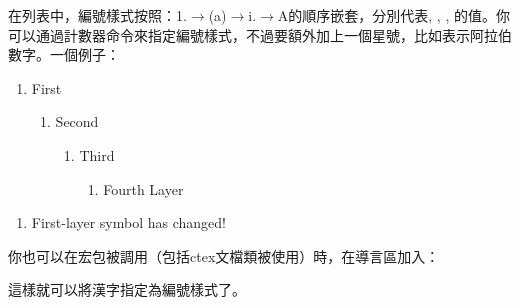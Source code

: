 在列表中，編號樣式按照：1.$\rightarrow$(a)$\rightarrow$i.$\rightarrow$A的順序嵌套，分別代表, , , 的值。你可以通過計數器命令來指定編號樣式，不過要額外加上一個星號，比如表示阿拉伯數字。一個例子：
\begin{codeshow}
\begin{enumerate}\item First
  \begin{enumerate}\item Second
     \begin{enumerate}\item Third
       \begin{enumerate}
       \item Fourth Layer
\end{enumerate}\end{enumerate}
\end{enumerate}\end{enumerate}
\renewcommand{\theenumi}
  {\roman{enumi}}
\renewcommand{\labelenumi}
  {(\theenumi)}
\begin{enumerate}
\item First-layer symbol has changed!
\end{enumerate}
\end{codeshow}

你也可以在宏包被調用（包括ctex文檔類被使用）時，在導言區加入：
\begin{latex}
\AddEnumerateCounter{\chinese}{\chinese}{}
\end{latex}

這樣就可以將漢字指定為編號樣式了。

